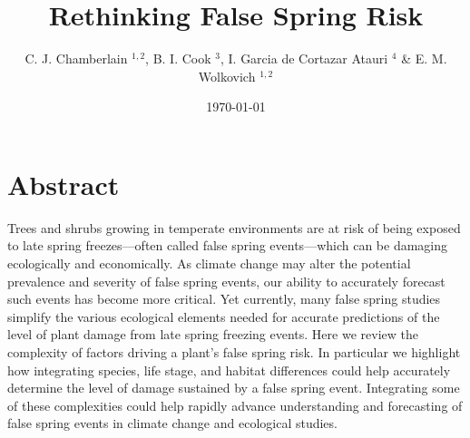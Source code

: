 \documentclass{article}\usepackage[]{graphicx}\usepackage[]{color}
\begin{document}
\title{Rethinking False Spring Risk}
\author{C. J. Chamberlain $^{1,2}$, B. I. Cook $^{3}$, I. Garcia de Cortazar Atauri $^{4}$ \& E. M. Wolkovich $^{1,2}$}
\date{\today}
\maketitle 
 

\renewcommand{\thetable}{\arabic{table}}
\renewcommand{\thefigure}{\arabic{figure}}
\renewcommand{\labelitemi}{$-$}



\section{Abstract}
Trees and shrubs growing in temperate environments are at risk of being exposed to late spring freezes---often called false spring events---which can be damaging ecologically and economically. As climate change may alter the potential prevalence and severity of false spring events, our ability to accurately forecast such events has become more critical. Yet currently, many false spring studies simplify the various ecological elements needed for accurate predictions of the level of plant damage from late spring freezing events. Here we review the complexity of factors driving a plant's false spring risk. In particular we highlight how integrating species, life stage, and habitat differences could help accurately determine the level of damage sustained by a false spring event. %
Integrating some of these complexities could help rapidly advance understanding and forecasting of false spring events in climate change and ecological studies.
\end{document}
